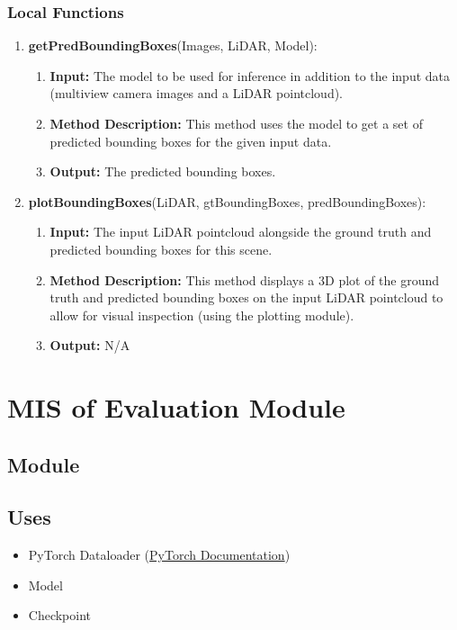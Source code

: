 \documentclass[12pt, titlepage]{article}
\begin{document}
\subsubsection{Local Functions}
\begin{enumerate}
  \item \textbf{getPredBoundingBoxes}(Images, LiDAR, Model):
  \begin{enumerate}
    \item \textbf{Input:} The model to be used for inference in addition to the input data (multiview camera images and a LiDAR pointcloud).
    \item \textbf{Method Description:} This method uses the model to get a set of predicted bounding boxes for the given input data.
    \item \textbf{Output:} The predicted bounding boxes.
  \end{enumerate}
  \item \textbf{plotBoundingBoxes}(LiDAR, gtBoundingBoxes, predBoundingBoxes):
  \begin{enumerate}
    \item \textbf{Input:} The input LiDAR pointcloud alongside the ground truth and predicted bounding boxes for this scene. 
    \item \textbf{Method Description:} This method displays a 3D plot of the ground truth and predicted bounding boxes on the input LiDAR pointcloud to allow for visual inspection (using the plotting module).
    \item \textbf{Output:} N/A
  \end{enumerate}
\end{enumerate}

\newpage

\section{MIS of Evaluation Module} \label{Module} 

\subsection{Module}



\subsection{Uses}
\begin{itemize}
  \item PyTorch Dataloader (\href{https://pytorch.org/tutorials/beginner/basics/data_tutorial.html}{PyTorch Documentation})
  \item Model
  \item Checkpoint
\end{itemize}
\end{document}
